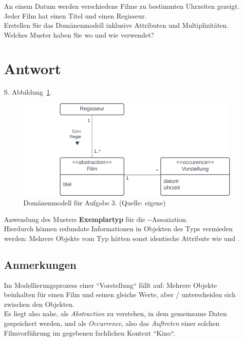 An einem Datum werden verschiedene Filme zu bestimmten Uhrzeiten gezeigt.
Jeder Film hat einen Titel und einen Regisseur.\\

\noindent
Erstellen Sie das Domänenmodell inklusive Attributen und Multiplizitäten.\\

\noindent
Welches Muster haben Sie wo und wie verwendet?


\section*{Antwort}
S. Abbildung~\ref{fig:film}.

\begin{figure}
    \centering
    \includegraphics[scale=0.5]{chapters/aufgabe 3/img/film}
    \caption{Domänenmodell für Aufgabe 3. (Quelle: eigene)}
    \label{fig:film}
\end{figure}

\noindent
Anwendung des Musters \textbf{Exemplartyp} für die --Assoziation.\\

\noindent
Hierdurch können redundate Informationen in Objekten des Typs  vermieden werden: Mehrere Objekte vom Typ  hätten sonst identische Attribute wie  und .\\

\subsection*{Anmerkungen}
Im Modellierungsprozess einer ``Vorstellung`` fällt auf: Mehrere Objekte beinhalten für einen Film und seinen  gleiche Werte, aber  /  unterscheiden sich zwischen den Objekten.\\
Es liegt also nahe,  als \textit{Abstraction} zu verstehen, in dem gemeinsame Daten gespeichert werden, und  als \textit{Occurrence}, also das \textit{Auftreten} einer solchen Filmvorführung im gegebenen fachlichen Kontext ``Kino``.\\

